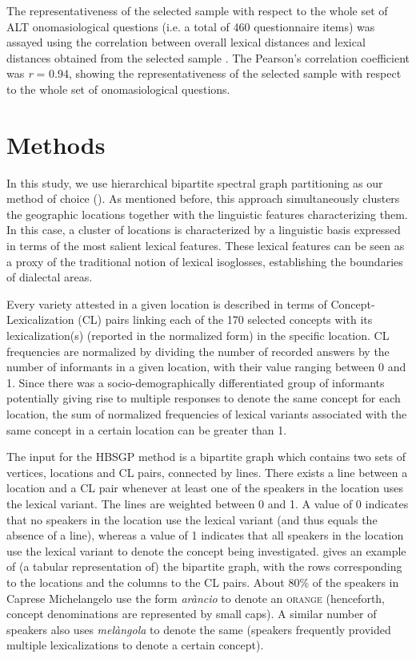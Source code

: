 \documentclass[output=paper]{LSP/langsci}
\begin{document}
The representativeness of the selected sample with respect to the whole set of ALT onomasiological questions (i.e. a total of 460 questionnaire items) was assayed using the correlation between overall lexical distances and lexical distances obtained from the selected sample \citep{wieling_analyzing_2014}. The Pearson’s correlation coefficient was \textit{r} = 0.94, showing the representativeness of the selected sample with respect to the whole set of onomasiological questions.

\section{Methods}
In this study, we use hierarchical bipartite spectral graph partitioning as our method of choice (\cite{wieling_bipartite_2011}). As mentioned before, this approach simultaneously clusters the geographic locations together with the linguistic features characterizing them. In this case, a cluster of locations is characterized by a linguistic basis expressed in terms of the most salient lexical features. These lexical features can be seen as a proxy of the traditional notion of lexical isoglosses, establishing the boundaries of dialectal areas.

Every variety attested in a given location is described in terms of Concept-Lexicalization (CL) pairs linking each of the 170 selected concepts with its lexicalization(s) (reported in the normalized form) in the specific location. CL frequencies are normalized by dividing the number of recorded answers by the number of informants in a given location, with their value ranging between 0 and 1. Since there was a socio-demographically differentiated group of informants potentially giving rise to multiple responses to denote the same concept for each location, the sum of normalized frequencies of lexical variants associated with the same concept in a certain location can be greater than 1.

The input for the HBSGP method is a bipartite graph which contains two sets of vertices, locations and CL pairs, connected by lines. There exists a line between a location and a CL pair whenever at least one of the speakers in the location uses the lexical variant. The lines are weighted between 0 and 1. A value of 0 indicates that no speakers in the location use the lexical variant (and thus equals the absence of a line), whereas a value of 1 indicates that all speakers in the location use the lexical variant to denote the concept being investigated.  gives an example of (a tabular representation of) the bipartite graph, with the rows corresponding to the locations and the columns to the CL pairs. About 80\% of the speakers in Caprese Michelangelo use the form \textit{aràncio} to denote an \textsc{orange} (henceforth, concept denominations are represented by small caps). A similar number of speakers also uses \textit{melàngola} to denote the same (speakers frequently provided multiple lexicalizations to denote a certain concept). 
\end{document}
